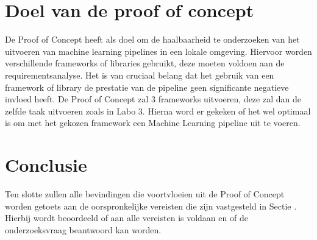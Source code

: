 \section{Doel van de proof of concept}
De Proof of Concept heeft als doel om de haalbaarheid te onderzoeken van het uitvoeren van machine learning pipelines in een lokale omgeving. Hiervoor worden verschillende frameworks of libraries  gebruikt, deze moeten voldoen aan de requirementsanalyse.
Het is van cruciaal belang dat het gebruik van een framework of library de prestatie van de pipeline geen significante negatieve invloed heeft. De Proof of Concept zal 3 frameworks uitvoeren, deze zal dan de zelfde taak uitvoeren zoals in Labo 3. Hierna word er gekeken of het wel optimaal is om met het gekozen framework een Machine Learning pipeline uit te voeren.
\section{Conclusie}
Ten slotte zullen alle bevindingen die voortvloeien uit de Proof of Concept worden getoets aan de oorspronkelijke vereisten die zijn vastgesteld in Sectie . Hierbij
wordt beoordeeld of aan alle vereisten is voldaan en of de onderzoeksvraag beantwoord kan worden.

